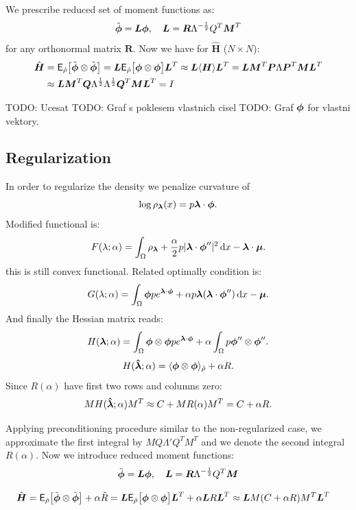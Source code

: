 \documentclass{article}
\def\d{\,{\rm d}}               %
\def\tn#1{\boldsymbol{#1}}
\def \E{{\mathsf E}}
\def\todo#1{{\color{red}TODO: #1}}
\def\avg#1{\langle#1\rangle}
\def\abs#1{|#1|}
\begin{document}
We prescribe reduced set of moment functions as:
\[
   \tilde\vphi =  \tn L \vphi, \quad \tn L =  \tn R \Lambda^{-\frac12} Q^T \tn M^T
\]
for any orthonormal matrix $\tn R$. 
Now we have for $\hat{\tn H}$ ($N\times N$):
\begin{align*}
  \hat{\tn H} &= \E_{\estrho}\big[ \tilde\vphi \otimes \tilde\vphi\big] 
              = \tn L \E_{\estrho} \big[\vphi \otimes \vphi \big] \tn L^T 
              \approx \tn L \avg{\tn H} \tn L^T = \tn L \tn M^T \tn P \Lambda \tn P^T \tn M \tn L^T \\
              &\approx \tn L \tn M^T \tn Q \Lambda^{\frac12} \Lambda^{\frac12} \tn Q^T \tn M \tn L^T  = I 
\end{align*}


\todo{Ucesat}
\todo{Graf s poklesem vlastnich cisel}
\todo{Graf $\mathbf{\boldsymbol{\phi}}$ for vlastni vektory.}

\subsection{Regularization}
In order to regularize the density we penalize curvature of
\[
\log \rho_{{\mathbf{\boldsymbol{\lambda}}}}(x) = p {\mathbf{\boldsymbol{\lambda}}}\cdot\mathbf{\boldsymbol{\phi}}.
\]
Modified functional is:
\[
    F(\lambda; \alpha) = \int_{\Omega} \rho_{\vl} + \frac{\alpha}{2} p \abs{\vl \cdot \vphi ''}^2 \d x- \vl\cdot\vmu.
\]
this is still convex functional. Related optimally condition is:
\[
    G(\lambda; \alpha) = \int_{\Omega} \vphi p e^{\vl \cdot\vphi} + \alpha p \vl (\vl \cdot \vphi '') \d x- \vmu.
\]
And finally the Hessian matrix reads:
\[
    H({\mathbf{\boldsymbol{\lambda}}}; \alpha) = \int_{\Omega} \mathbf{\boldsymbol{\phi}}\otimes \mathbf{\boldsymbol{\phi}} p e^{{\mathbf{\boldsymbol{\lambda}}} \cdot\mathbf{\boldsymbol{\phi}}} + \alpha \int_{\Omega} p \mathbf{\boldsymbol{\phi}}'' \otimes \mathbf{\boldsymbol{\phi}}''.
\]
\[
H(\estvl; \alpha) = \avg{\vphi \otimes \vphi}_{\estrho} + \alpha R.
\]
Since $R(\alpha)$ have first two rows and columns zero:
\[
M H({\mathbf{\boldsymbol{\hat\lambda}}}; \alpha)  M^T   \approx   C + M R(\alpha) M^T =  C + \alpha R.
\]

Applying preconditioning procedure similar to the non-regularized case, we approximate the first integral by $M Q {\Lambda'} Q^T M^T$ and we denote the second integral $R(\alpha)$. Now we introduce reduced moment functions:
\[
    \tilde\vphi =  \tn L \vphi, \quad \tn L =  \tn R \Lambda^{-\frac12} Q^T \tn M
\]

    \begin{align*}
      \hat{\tn H} &= \E_{\estrho}\big[ \tilde\vphi \otimes \tilde\vphi\big] + \alpha \tilde R 
                  = \tn L \E_{\estrho} \big[\vphi \otimes \vphi \big] \tn L^T  + \alpha \tn L R \tn L^T
                  \approx \tn L M (C + \alpha R)  M^T \tn L^T
    \end{align*}
\end{document}
